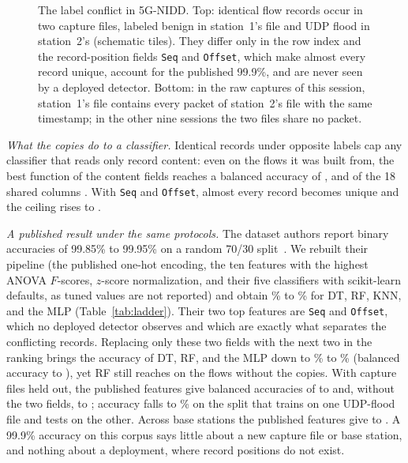 \begin{table}[t]
\caption{Label conflicts in 5G-NIDD. Content: all fields of the published encoding except row index, \texttt{Seq}, \texttt{Offset}, and the labels. Ceiling: balanced accuracy of the best lookup on distinct records, in sample.}
\label{tab:conflict}
\centering
\scriptsize
\setlength{\tabcolsep}{3pt}

\end{table}

\begin{figure}[t]
\centering
\resizebox{\columnwidth}{!}{}
\caption{The label conflict in 5G-NIDD. Top: identical flow records occur in two capture files, labeled benign in station~1's file and UDP flood in station~2's (schematic tiles). They differ only in the row index and the record-position fields \texttt{Seq} and \texttt{Offset}, which make almost every record unique, account for the published 99.9\%, and are never seen by a deployed detector. Bottom: in the raw captures of this session, station~1's file contains every packet of station~2's file with the same timestamp; in the other nine sessions the two files share no packet.}
\label{fig:conflict}
\end{figure}

\emph{What the copies do to a classifier.} Identical records under opposite labels cap any classifier that reads only record content: even on the flows it was built from, the best function of the \LcNFeat{} content fields reaches a balanced accuracy of \LcCeilNative{}, and of the 18 shared columns \LcCeilShared{}. With \texttt{Seq} and \texttt{Offset}, almost every record becomes unique and the ceiling rises to \LcCeilPos{}.

\emph{A published result under the same protocols.} The dataset authors report binary accuracies of 99.85\% to 99.95\% on a random 70/30 split~\cite{samarakoon2022niddarxiv,siriwardhana2025descriptor}. We rebuilt their pipeline (the published one-hot encoding, the ten features with the highest ANOVA $F$-scores, $z$-score normalization, and their five classifiers with scikit-learn defaults, as tuned values are not reported) and obtain \PubRzAccMin\% to \PubRzAccMax\% for DT, RF, KNN, and the MLP (Table~\ref{tab:ladder}). Their two top features are \texttt{Seq} and \texttt{Offset}, which no deployed detector observes and which are exactly what separates the conflicting records. Replacing only these two fields with the next two in the ranking brings the accuracy of DT, RF, and the MLP down to \PubOneNoposAccMin\% to \PubOneNoposAccMax\% (balanced accuracy \PubOneNoposBAmin{} to \PubOneNoposBAmax), yet RF still reaches \PubOneRFclean{} on the flows without the copies. With capture files held out, the published features give balanced accuracies of \PubTwoPubBAmin{} to \PubTwoPubBAmax{} and, without the two fields, \PubTwoNoposBAmin{} to \PubTwoNoposBAmax{}; accuracy falls to \PubTwoNoposFoldAccMin\% on the split that trains on one UDP-flood file and tests on the other. Across base stations the published features give \PubThreePubBAmin{} to \PubThreePubBAmax{}. A 99.9\% accuracy on this corpus says little about a new capture file or base station, and nothing about a deployment, where record positions do not exist.

